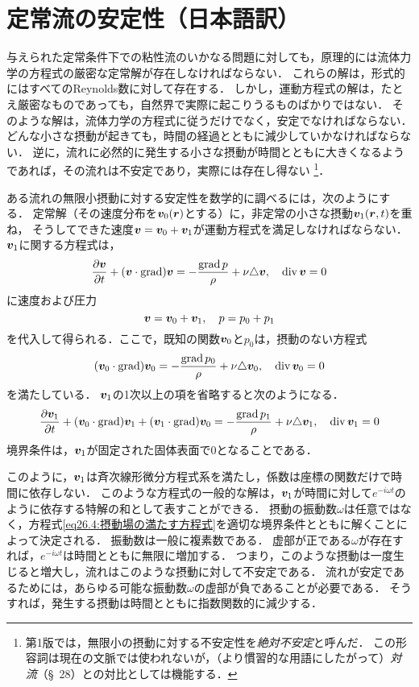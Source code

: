 \section{\spade 定常流の安定性（日本語訳）}\label{sec:26}
与えられた定常条件下での粘性流のいかなる問題に対しても，原理的には流体力学の方程式の厳密な定常解が存在しなければならない．
これらの解は，形式的にはすべてのReynolds数に対して存在する．
しかし，運動方程式の解は，たとえ厳密なものであっても，自然界で実際に起こりうるものばかりではない．
そのような解は，流体力学の方程式に従うだけでなく，安定でなければならない．
どんな小さな摂動が起きても，時間の経過とともに減少していかなければならない．
逆に，流れに必然的に発生する小さな摂動が時間とともに大きくなるようであれば，その流れは不安定であり，実際には存在し得ない
\footnote{
第1版では，無限小の摂動に対する不安定性を\emph{絶対不安定}と呼んだ．
この形容詞は現在の文脈では使われないが，（より慣習的な用語にしたがって）\emph{対流}（\S~28）との対比としては機能する．
}．


ある流れの無限小摂動に対する安定性を数学的に調べるには，次のようにする．
定常解（その速度分布を$\vb*{v}_0(\vb*{r})$とする）に，非定常の小さな摂動$\vb*{v}_1(\vb*{r},t)$を重ね，
そうしてできた速度$\vb*{v}=\vb*{v}_0+\vb*{v}_1$が運動方程式を満足しなければならない．
$\vb*{v}_1$に関する方程式は，
\begin{equation}\label{eq26.1:NS方程式}
    \pdv{\vb*{v}}{t} + (\vb*{v}\cdot\operatorname{grad})\vb*{v} = -\frac{\operatorname{grad} p}{\rho} + \nu\triangle\vb*{v}, \quad \operatorname{div}\vb*{v}=0
\end{equation}
に速度および圧力
\begin{equation}\label{eq26.2:平均場と摂動場の分離}
    \vb*{v} = \vb*{v}_0+\vb*{v}_1, \quad p = p_0+p_1
\end{equation}
を代入して得られる．ここで，既知の関数$\vb*{v}_0$と$p_0$は，摂動のない方程式
\begin{equation}
    (\vb*{v}_0\cdot\operatorname{grad})\vb*{v}_0 = -\frac{\operatorname{grad} p_0}{\rho} + \nu\triangle\vb*{v}_0, \quad \operatorname{div}\vb*{v}_0=0
\end{equation}
を満たしている．
$\vb*{v}_1$の1次以上の項を省略すると次のようになる．
\begin{equation}\label{eq26.4:摂動場の満たす方程式}
    \pdv{\vb*{v}_1}{t} + (\vb*{v}_0\cdot\operatorname{grad})\vb*{v}_1 + (\vb*{v}_1\cdot\operatorname{grad})\vb*{v}_0
    = -\frac{\operatorname{grad} p_1}{\rho} + \nu\triangle\vb*{v}_1 , \quad \operatorname{div}\vb*{v}_1=0
\end{equation}
境界条件は，$\vb*{v}_1$が固定された固体表面で0となることである．


このように，$\vb*{v}_1$は斉次線形微分方程式系を満たし，係数は座標の関数だけで時間に依存しない．
このような方程式の一般的な解は，$\vb*{v}_1$が時間に対して$e^{-i\omega t}$のように依存する特解の和として表すことができる．
摂動の振動数$\omega$は任意ではなく，方程式\eqref{eq26.4:摂動場の満たす方程式}を適切な境界条件とともに解くことによって決定される．
振動数は一般に複素数である．
虚部が正である$\omega$が存在すれば，$e^{-i\omega t}$は時間とともに無限に増加する．
つまり，このような摂動は一度生じると増大し，流れはこのような摂動に対して不安定である．
流れが安定であるためには，あらゆる可能な振動数$\omega$の虚部が負であることが必要である．
そうすれば，発生する摂動は時間とともに指数関数的に減少する．



